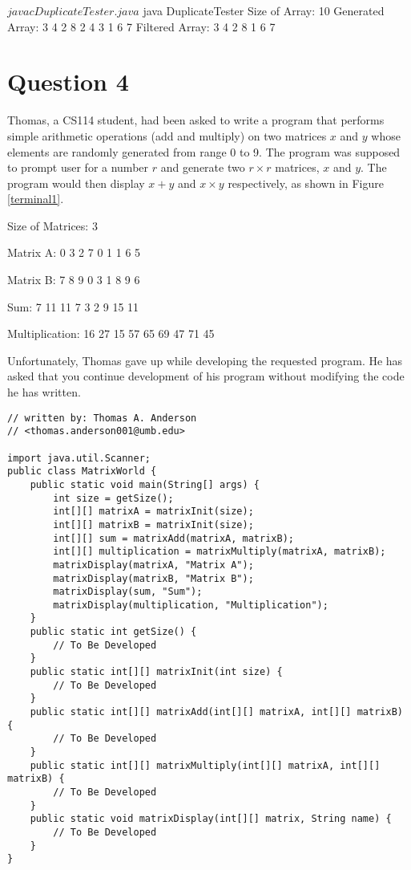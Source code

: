 \begin{terminal}
$ javac DuplicateTester.java
$ java DuplicateTester
Size of Array: 10
Generated Array:
3 4 2 8 2 4 3 1 6 7
Filtered Array:
3 4 2 8 1 6 7
\end{terminal}

\newpage

\section*{Question 4}
Thomas, a CS114 student, had been asked to write a program that performs simple arithmetic operations (add and multiply) on two matrices $x$ and $y$ whose elements are randomly generated from range 0 to 9.
The program was supposed to prompt user for a number $r$ and generate two $r \times r$ matrices, $x$ and $y$.
The program would then display $x + y$ and $x \times y$ respectively, as shown in Figure \ref{terminal1}.

\renewcommand{\lstlistingname}{Figure}
\begin{terminal}
Size of Matrices: 3

Matrix A:
  0   3   2
  7   0   1
  1   6   5

Matrix B:
  7   8   9
  0   3   1
  8   9   6

Sum:
  7  11  11
  7   3   2
  9  15  11

Multiplication:
 16  27  15
 57  65  69
 47  71  45
\end{terminal}

\newpage

Unfortunately, Thomas gave up while developing the requested program.
He has asked that you continue development of his program without modifying the code he has written.

\lstset{caption=}
\lstset{language=Java,tabsize=4}
\begin{lstlisting}
// written by: Thomas A. Anderson
// <thomas.anderson001@umb.edu>

import java.util.Scanner;
public class MatrixWorld {
	public static void main(String[] args) {
		int size = getSize();
		int[][] matrixA = matrixInit(size);
		int[][] matrixB = matrixInit(size);
		int[][] sum = matrixAdd(matrixA, matrixB);
		int[][] multiplication = matrixMultiply(matrixA, matrixB);
		matrixDisplay(matrixA, "Matrix A");
		matrixDisplay(matrixB, "Matrix B");
		matrixDisplay(sum, "Sum");
		matrixDisplay(multiplication, "Multiplication");
	}
	public static int getSize() {
		// To Be Developed
	}
	public static int[][] matrixInit(int size) {
		// To Be Developed
	}
	public static int[][] matrixAdd(int[][] matrixA, int[][] matrixB) {
		// To Be Developed
	}
	public static int[][] matrixMultiply(int[][] matrixA, int[][] matrixB) {
		// To Be Developed
	}
	public static void matrixDisplay(int[][] matrix, String name) {
		// To Be Developed
	}
}
\end{lstlisting}

